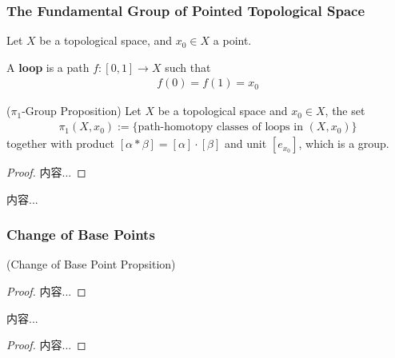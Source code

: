 \documentclass[Total.tex]{subfiles}
\begin{document}
	\subsubsection{The Fundamental Group of Pointed Topological Space}
	\begin{Def}
		Let $X$ be a topological space, and $x_0\in X$ a point.
		
		A \textbf{loop} is a path $f:[0,1]\rightarrow X$ such that
		\begin{gather*}
			f(0)=f(1)=x_0
		\end{gather*}
	\end{Def}
	\begin{proposition}
		($\pi_1$-Group Proposition) Let $X$ be a topological space and $x_0\in X$, the set
		\begin{gather*}
			\pi_1(X,x_0):=\{\mbox{path-homotopy classes of loops in }(X,x_0)\}
		\end{gather*}
		together with product $[\alpha*\beta]=[\alpha]\cdot [\beta]$ and unit $[e_{x_0}]$, which is a group.
	\end{proposition}
	\begin{proof}
		内容...
	\end{proof}
	
	\begin{Def}
		内容...
	\end{Def}
	\subsubsection{Change of Base Points}	
	\begin{proposition}
		(Change of Base Point Propsition)
	\end{proposition}
	\begin{proof}
		内容...
	\end{proof}
	
	\begin{corollary}
		内容...
	\end{corollary}
	\begin{proof}
		内容...
	\end{proof}
\end{document}
